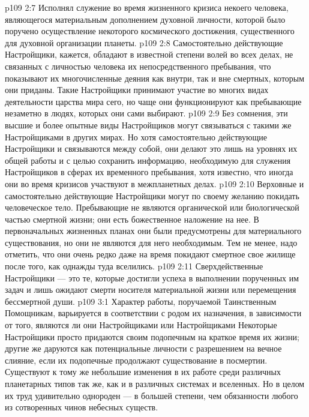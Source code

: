 \vs p109 2:7 \pc {}\bibnobreakspace Исполнял служение во время жизненного кризиса некоего человека, являющегося материальным дополнением духовной личности, которой было поручено осуществление некоторого космического достижения, существенного для духовной организации планеты.
\vs p109 2:8 \pc Самостоятельно действующие Настройщики, кажется, обладают в известной степени волей во всех делах, не связанных с личностью человека их непосредственного пребывания, что показывают их многочисленные деяния как внутри, так и вне смертных, которым они приданы. Такие Настройщики принимают участие во многих видах деятельности царства мира сего, но чаще они функционируют как пребывающие незаметно в людях, которых они сами выбирают.
\vs p109 2:9 Без сомнения, эти высшие и более опытные виды Настройщиков могут связываться с такими же Настройщиками в других мирах. Но хотя самостоятельно действующие Настройщики и связываются между собой, они делают это лишь на уровнях их общей работы и с целью сохранить информацию, необходимую для служения Настройщиков в сферах их временного пребывания, хотя известно, что иногда они во время кризисов участвуют в межпланетных делах.
\vs p109 2:10 Верховные и самостоятельно действующие Настройщики могут по своему желанию покидать человеческое тело. Пребывающие не являются органической или биологической частью смертной жизни; они есть божественное наложение на нее. В первоначальных жизненных планах они были предусмотрены для материального существования, но они не являются для него необходимым. Тем не менее, надо отметить, что они очень редко даже на время покидают смертное свое жилище после того, как однажды туда вселились.
\vs p109 2:11 Сверхдейственные Настройщики --- это те, которые достигли успеха в выполнении порученных им задач и лишь ожидают смерти носителя материальной жизни или перемещения бессмертной души.
\vs p109 3:1 Характер работы, поручаемой Таинственным Помощникам, варьируется в соответствии с родом их назначения, в зависимости от того, являются ли они Настройщиками  или Настройщиками  Некоторые Настройщики просто придаются своим подопечным на краткое время их жизни; другие же даруются как потенциальные личности с разрешением на вечное слияние, если их подопечные продолжают существование в посмертии. Существуют к тому же небольшие изменения в их работе среди различных планетарных типов так же, как и в различных системах и вселенных. Но в целом их труд удивительно однороден --- в большей степени, чем обязанности любого из сотворенных чинов небесных существ.

